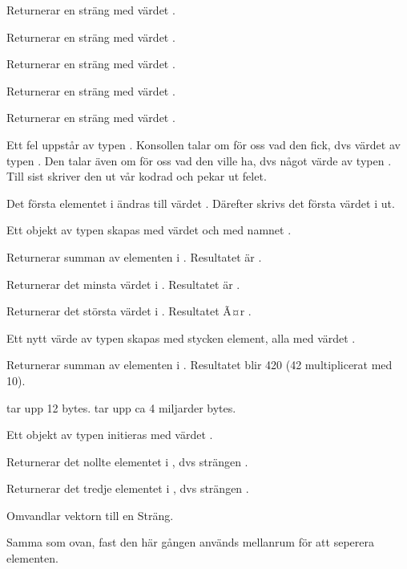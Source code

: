 \Subtask Returnerar en sträng med värdet .

\Subtask Returnerar en sträng med värdet .

\Subtask Returnerar en sträng med värdet .

\Subtask Returnerar en sträng med värdet .

\Subtask Returnerar en sträng med värdet .

\Subtask Ett fel uppstår av typen . Konsollen talar om för oss vad den fick, dvs värdet  av typen . Den talar även om för oss vad den ville ha, dvs något värde av typen . Till sist skriver den ut vår kodrad och pekar ut felet.

\Subtask Det första elementet i  ändras till värdet . Därefter skrivs det första värdet i  ut.

\Subtask Ett objekt av typen  skapas med värdet  och med namnet .

\Subtask Returnerar summan av elementen i . Resultatet är .

\Subtask Returnerar det minsta värdet i . Resultatet är .

\Subtask Returnerar det största värdet i . Resultatet Ã¤r .

\Subtask Ett nytt värde av typen  skapas med  stycken element, alla med värdet .

\Subtask Returnerar summan av elementen i . Resultatet blir 420 (42 multiplicerat med 10).

\Subtask {} tar upp 12 bytes.  tar upp ca 4 miljarder bytes.

\Task 

\Subtask Ett objekt av typen  initieras med värdet .

\Subtask Returnerar det nollte elementet i , dvs strängen .

\Subtask Returnerar det tredje elementet i , dvs strängen \code{!}.

\Subtask Omvandlar vektorn till en Sträng.

\Subtask Samma som ovan, fast den här gången används mellanrum för att seperera elementen.

